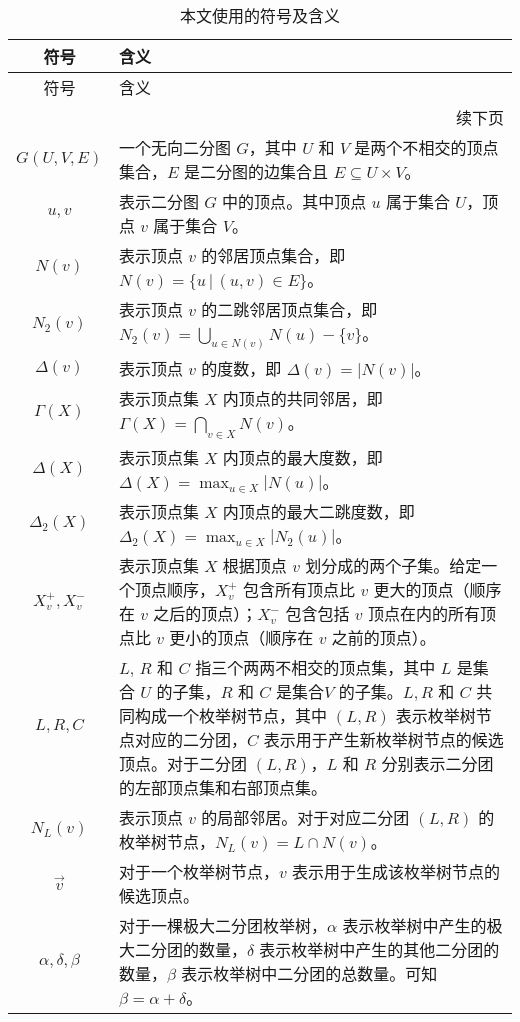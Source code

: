 \begin{longtable}[htbp]{|c|p{12cm}|}
    \caption{本文使用的符号及含义}
    \label{tab:definition} \\
    
    \hline
    符号 & 含义 \\ \hline
    \endfirsthead
    
    \hline
    符号 & 含义 \\ \hline
    \endhead
    
    \hline
    \multicolumn{2}{r}{续下页} \\
    \endfoot
    
    \hline
    \endlastfoot
    
    $G(U,V,E)$ & 一个无向二分图 $G$，其中 $U$ 和 $V$ 是两个不相交的顶点集合，$E$ 是二分图的边集合且 $E \subseteq U \times V$。 \\ \hline
    $u,v$ & 表示二分图 $G$ 中的顶点。其中顶点 $u$ 属于集合 $U$，顶点 $v$ 属于集合 $V$。 \\ \hline
    $N(v)$ & 表示顶点 $v$ 的邻居顶点集合，即 $N(v) = \{u \,|\, (u,v) \in E\}$。 \\ \hline
    $N_2(v)$ & 表示顶点 $v$ 的二跳邻居顶点集合，即 $N_2(v) = \bigcup_{u \in N(v)} N(u) - \{v\}$。 \\ \hline
    $\Delta(v)$ & 表示顶点 $v$ 的度数，即 $\Delta(v) = |N(v)|$。 \\ \hline
    $\Gamma(X)$ & 表示顶点集 $X$ 内顶点的共同邻居，即 $\Gamma(X) = \bigcap_{v \in X} N(v)$。 \\ \hline
    $\Delta(X)$ & 表示顶点集 $X$ 内顶点的最大度数，即 $\Delta(X) = \max_{u \in X} |N(u)|$。 \\ \hline
    $\Delta_2(X)$ & 表示顶点集 $X$ 内顶点的最大二跳度数，即 $\Delta_2(X) = \max_{u \in X} |N_2(u)|$。 \\ \hline
    $X_v^+, X_v^-$ & 表示顶点集 $X$ 根据顶点 $v$ 划分成的两个子集。给定一个顶点顺序，$X_v^+$ 包含所有顶点比 $v$ 更大的顶点（顺序在 $v$ 之后的顶点）；$X_v^-$ 包含包括 $v$ 顶点在内的所有顶点比 $v$ 更小的顶点（顺序在 $v$ 之前的顶点）。 \\ \hline
    $L,R,C$ & $L$, $R$ 和 $C$ 指三个两两不相交的顶点集，其中 $L$ 是集合 $U$ 的子集，$R$ 和 $C$ 是集合$V$ 的子集。$L,R$ 和 $C$ 共同构成一个枚举树节点，其中 $(L,R)$ 表示枚举树节点对应的二分团，$C$ 表示用于产生新枚举树节点的候选顶点。对于二分团 $(L,R)$，$L$ 和 $R$ 分别表示二分团的左部顶点集和右部顶点集。 \\ \hline
    $N_L(v)$ & 表示顶点 $v$ 的局部邻居。对于对应二分团 $(L,R)$ 的枚举树节点，$N_L(v) = L \cap N(v)$。 \\ \hline
    $\vec{v}$ & 对于一个枚举树节点，$v$ 表示用于生成该枚举树节点的候选顶点。 \\ \hline
    $\alpha, \delta, \beta$ & 对于一棵极大二分团枚举树，$\alpha$ 表示枚举树中产生的极大二分团的数量，$\delta$ 表示枚举树中产生的其他二分团的数量，$\beta$ 表示枚举树中二分团的总数量。可知 $\beta = \alpha + \delta$。 \\ \hline
\end{longtable}

